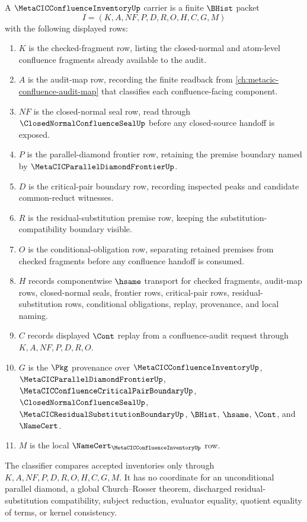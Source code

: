 \begin{definition}\label{def:metacic-confluence-inventory-carrier}
A $\MetaCICConfluenceInventoryUp$ carrier is a finite $\BHist$ packet
$$
I=(K,A,NF,P,D,R,O,H,C,G,M)
$$
with the following displayed rows:
\begin{enumerate}
\item $K$ is the checked-fragment row, listing the closed-normal and atom-level confluence fragments already available to the audit.
\item $A$ is the audit-map row, recording the finite readback from \autoref{ch:metacic-confluence-audit-map} that classifies each confluence-facing component.
\item $NF$ is the closed-normal seal row, read through $\ClosedNormalConfluenceSealUp$ before any closed-source handoff is exposed.
\item $P$ is the parallel-diamond frontier row, retaining the premise boundary named by $\MetaCICParallelDiamondFrontierUp$.
\item $D$ is the critical-pair boundary row, recording inspected peaks and candidate common-reduct witnesses.
\item $R$ is the residual-substitution premise row, keeping the substitution-compatibility boundary visible.
\item $O$ is the conditional-obligation row, separating retained premises from checked fragments before any confluence handoff is consumed.
\item $H$ records componentwise $\hsame$ transport for checked fragments, audit-map rows, closed-normal seals, frontier rows, critical-pair rows, residual-substitution rows, conditional obligations, replay, provenance, and local naming.
\item $C$ records displayed $\Cont$ replay from a confluence-audit request through $K,A,NF,P,D,R,O$.
\item $G$ is the $\Pkg$ provenance over $\MetaCICConfluenceInventoryUp$, $\MetaCICParallelDiamondFrontierUp$, $\MetaCICConfluenceCriticalPairBoundaryUp$, $\ClosedNormalConfluenceSealUp$, $\MetaCICResidualSubstitutionBoundaryUp$, $\BHist$, $\hsame$, $\Cont$, and $\NameCert$.
\item $M$ is the local $\NameCert_{\MetaCICConfluenceInventoryUp}$ row.
\end{enumerate}
The classifier compares accepted inventories only through $K,A,NF,P,D,R,O,H,C,G,M$. It has no coordinate for an unconditional parallel diamond, a global Church--Rosser theorem, discharged residual-substitution compatibility, subject reduction, evaluator equality, quotient equality of terms, or kernel consistency.
\end{definition}

